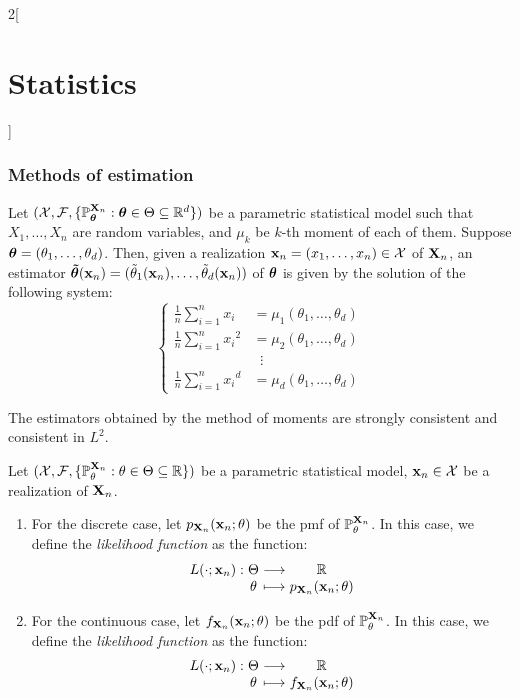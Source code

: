 \documentclass[../../../main_math.tex]{subfiles}
\begin{document}
\begin{multicols}{2}[\section{Statistics}]
  \subsubsection{Methods of estimation}
  \begin{definition}
    Let $(\mathcal{X},\mathcal{F},\{\mathbb{P}_{\boldsymbol{\mathrm{\theta}}}^{\boldsymbol{\mathrm{X}}_n}:\boldsymbol{\mathrm{\theta}}\in\Theta\subseteq \mathbb{R}^d\})$ be a parametric statistical model such that $X_1,\ldots,X_n$ are \iid random variables, and $\mu_k$ be $k$-th moment of each of them. Suppose $\boldsymbol{\mathrm{\theta}}=(\theta_1,\ldots,\theta_d)$. Then, given a realization $\boldsymbol{\mathrm{x}}_n=(x_1,\ldots,x_n)\in\mathcal{X}$ of $\boldsymbol{\mathrm{X}}_n$, an estimator $\boldsymbol{\mathrm{\tilde{\theta}}}(\boldsymbol{\mathrm{x}}_n)=(\tilde{\theta}_1(\boldsymbol{\mathrm{x}}_n),\ldots,\tilde{\theta}_d(\boldsymbol{\mathrm{x}}_n))$ of $\boldsymbol{\mathrm{\theta}}$ is given by the solution of the following system:
    $$
      \left\{
      \begin{aligned}
        \frac{1}{n}\sum_{i=1}^nx_i     & =\mu_1(\theta_1,\ldots,\theta_d) \\
        \frac{1}{n}\sum_{i=1}^n{x_i}^2 & =\mu_2(\theta_1,\ldots,\theta_d) \\
                                       & \;\;\vdots                       \\
        \frac{1}{n}\sum_{i=1}^n{x_i}^d & =\mu_d(\theta_1,\ldots,\theta_d)
      \end{aligned}
      \right.
    $$
  \end{definition}
  \begin{proposition}
    The estimators obtained by the method of moments are strongly consistent and consistent in $L^2$.
  \end{proposition}
  \begin{definition}[Likelihood]
    Let $(\mathcal{X},\mathcal{F},\{\mathbb{P}_{\theta}^{\boldsymbol{\mathrm{X}}_n}:{\theta}\in\Theta\subseteq \mathbb{R}\})$ be a parametric statistical model, $\boldsymbol{\mathrm{x}}_n\in\mathcal{X}$ be a realization of $\boldsymbol{\mathrm{X}}_n$.
    \begin{enumerate}
      \item For the discrete case, let $p_{\boldsymbol{\mathrm{X}}_n}(\boldsymbol{\mathrm{x}}_n;\theta)$ be the pmf of $\mathbb{P}_{\theta}^{\boldsymbol{\mathrm{X}}_n}$. In this case, we define the \emph{likelihood function} as the function:
            $$\function{L(\cdot;\vf{x}_n)}{\Theta}{\RR}{\theta}{p_{\vf{X}_n}(\vf{x}_n;\theta)}$$
      \item For the continuous case, let $f_{\boldsymbol{\mathrm{X}}_n}(\boldsymbol{\mathrm{x}}_n;\theta)$ be the pdf of $\mathbb{P}_{\theta}^{\boldsymbol{\mathrm{X}}_n}$. In this case, we define the \emph{likelihood function} as the function:
            $$\function{L(\cdot;\vf{x}_n)}{\Theta}{\RR}{\theta}{f_{\vf{X}_n}(\vf{x}_n;\theta)}$$

\end{enumerate}
\end{definition}
\end{multicols}
\end{document}
